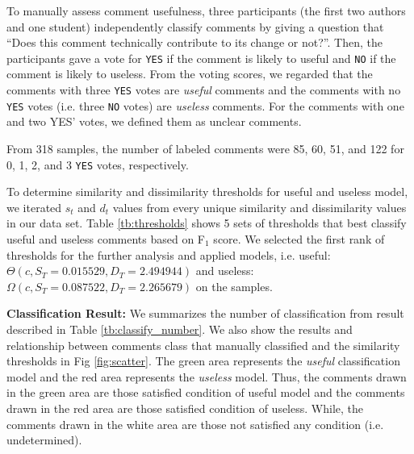 To manually assess comment usefulness, three participants (the first two authors and one student) independently classify comments by giving a question that “Does this comment technically contribute to its change or not?”. Then, the participants gave a vote for \texttt{YES} if the comment is likely to useful and  \texttt{NO}  if the comment is likely to useless. From the voting scores, we regarded that the comments with three  \texttt{YES}  votes are \emph{useful} comments and the comments with no  \texttt{YES}  votes (i.e. three  \texttt{NO}  votes) are \emph{useless} comments. For the comments with one and two YES’ votes, we defined them as unclear comments.

%

From 318 samples, the number of labeled comments were 85, 60, 51, and 122 for 0, 1, 2, and 3 \texttt{YES} votes, respectively.

To determine similarity and dissimilarity thresholds for useful and useless model, we iterated $s_t$ and $d_t$ values from every unique similarity and dissimilarity values in our data set.
Table \ref{tb:thresholds} shows 5 sets of thresholds that best classify useful and useless comments based on F$_1$ score. We selected the first rank of thresholds for the further analysis and applied models, i.e. useful: $\Theta(c,S_T=0.015529,D_T=2.494944)$ and useless: $\Omega(c,S_T=0.087522,D_T=2.265679)$ on the samples.

\textbf{Classification Result:}  We summarizes the number of classification from result described in Table \ref{tb:classify_number}.  We also show the results and relationship between comments class that manually classified and the similarity thresholds in Fig  \ref{fig:scatter}. The green area represents the \emph{useful} classification model and the red area represents the \emph{useless} model. Thus, the comments drawn in the green area are those satisfied condition of useful model and the comments drawn in the red area are those satisfied condition of useless. While, the comments drawn in the white area are those not satisfied any condition (i.e. undetermined). 


